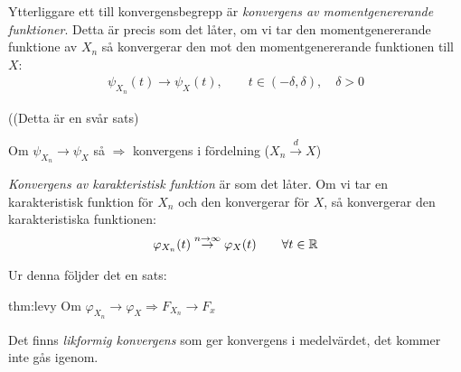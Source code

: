 \noindent Ytterliggare ett till konvergensbegrepp är \textit{konvergens av momentgenererande funktioner}. Detta är precis som det låter, om vi tar den momentgenererande funktione av $X_n$ så konvergerar den mot den momentgenererande funktionen till $X$:
\begin{equation*}
  \begin{gathered}
    \psi_{X_n}(t)\to\psi_X(t),\qquad t\in(-\delta,\delta),\quad \delta>0
  \end{gathered}
\end{equation*}
\par\bigskip
\begin{theo}
  ((Detta är en svår sats)
  \par\bigskip
  \noindent Om $\psi_{X_n}\to\psi_X$ så $\Rightarrow$ konvergens i fördelning ($X_n\stackrel{d}{\rightarrow}X$)
\end{theo}
\par\bigskip
\noindent\textit{Konvergens av karakteristisk funktion} är som det låter. Om vi tar en karakteristisk funktion för $X_n$ och den konvergerar för $X$, så konvergerar den karakteristiska funktionen:
\begin{equation*}
  \begin{gathered}
    \varphi_{X_n}(t)\stackrel{n\to\infty}{\rightarrow}\varphi_X(t)\qquad\forall t\in\mathbb{R}
  \end{gathered}
\end{equation*}\par
\noindent Ur denna följder det en sats:
\par\bigskip
\begin{theo}{thm:levy}
Om $\varphi_{X_n}\to\varphi_X\Rightarrow F_{X_n}\to F_x$
\end{theo}
\par\bigskip
\noindent Det finns \textit{likformig konvergens} som ger konvergens i medelvärdet, det kommer inte gås igenom.
\par\bigskip
